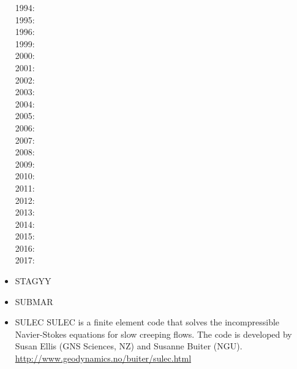 \begin{itemize}
1994: \cite{wibe94}\cite{befh94}\\
1995: \cite{full95}\cite{elfb95}\\
1996: \cite{bekh96}\\
1999: \cite{will99a}\cite{will99b}\\
2000: \cite{pybf00}\cite{bemh00}\\
2001: \cite{bejn01}\\
2002: \cite{hube02}\cite{pybf02}\\
2003: \cite{hube03}\cite{vamf03}\cite{wipo03}\cite{pymi03}\\
2004: \cite{bejn04}\cite{pycr04}\cite{pybe04}\cite{elsp04}\cite{geim04}\\
2005: \cite{gebi05}\cite{hubb05}\\
2006: \cite{pysk06}\cite{selz06}\\
2007: \cite{hube07}\cite{cubh07}\cite{mohb07}\\
2008: \cite{sebp08}\cite{wabj08}\cite{wabj08b}\cite{gopy08}\\
2009: \cite{kecw09}\cite{bejb09}\cite{bupb09}\cite{grba09}\cite{sihb09}\\
2010: \cite{albs10}\cite{albe10}\cite{grpy10}\cite{pygp10}\\
2011: \cite{cube11}\cite{bubj11}\cite{hube11}\\
2012: \cite{grpy12}\cite{grpy12b}\cite{kogp12}\cite{grbe12}\cite{jahu12}\\
2013: \cite{bubj13}\cite{chbe13}\cite{fihv13a}\cite{fihv13b}\cite{gobi13}\cite{grpy13}\cite{knak13}\cite{nipc13}\cite{jahm13}\\
2014: \cite{gogu14}\\
2015: \cite{albe15}\cite{bubj15}\cite{heps15}\\
2016: \cite{licu16}\\
2017: \cite{bube17}


\item STAGYY
\cite{rota11}
\cite{roct12}
\cite{yadl14}
\cite{crta14}
\cite{sisc16}
\cite{cogu17}
\cite{cosh18}\cite{bofc18}\cite{cold18}\cite{arcf18}
\cite{gult19}\cite{argc19}\cite{deli19}

\item SUBMAR

\cite{masr06}
\cite{masp07}
\cite{roms10}


\item SULEC
SULEC is a finite element code that solves the incompressible Navier-Stokes equations 
for slow creeping flows. The code is developed by Susan Ellis 
(GNS Sciences, NZ) and Susanne Buiter (NGU). 
\url{http://www.geodynamics.no/buiter/sulec.html}


\end{itemize}
